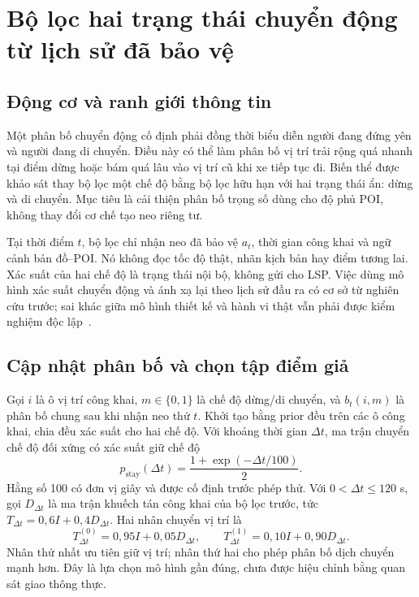 \section{Bộ lọc hai trạng thái chuyển động từ lịch sử đã bảo vệ}
\label{sec:switching-method}

\subsection{Động cơ và ranh giới thông tin}

Một phân bố chuyển động cố định phải đồng thời biểu diễn người đang đứng yên và người đang di chuyển. Điều này có thể làm phân bố vị trí trải rộng quá nhanh tại điểm dừng hoặc bám quá lâu vào vị trí cũ khi xe tiếp tục đi. Biến thể được khảo sát thay bộ lọc một chế độ bằng bộ lọc hữu hạn với hai trạng thái ẩn: dừng và di chuyển. Mục tiêu là cải thiện phân bố trọng số dùng cho độ phủ POI, không thay đổi cơ chế tạo neo riêng tư.

Tại thời điểm $t$, bộ lọc chỉ nhận neo đã bảo vệ $a_t$, thời gian công khai và ngữ cảnh bản đồ--POI. Nó không đọc tốc độ thật, nhãn kịch bản hay điểm tương lai. Xác suất của hai chế độ là trạng thái nội bộ, không gửi cho LSP. Việc dùng mô hình xác suất chuyển động và ánh xạ lại theo lịch sử đầu ra có cơ sở từ nghiên cứu trước; sai khác giữa mô hình thiết kế và hành vi thật vẫn phải được kiểm nghiệm độc lập~\cite{oya2019unknown}.

\subsection{Cập nhật phân bố và chọn tập điểm giả}

Gọi $i$ là ô vị trí công khai, $m\in\{0,1\}$ là chế độ dừng/di chuyển, và $b_t(i,m)$ là phân bố chung sau khi nhận neo thứ $t$. Khởi tạo bằng prior đều trên các ô công khai, chia đều xác suất cho hai chế độ. Với khoảng thời gian $\Delta t$, ma trận chuyển chế độ đối xứng có xác suất giữ chế độ
\begin{equation}
 p_{\mathrm{stay}}(\Delta t)=\frac{1+\exp(-\Delta t/100)}{2}.
\end{equation}
Hằng số 100 có đơn vị giây và được cố định trước phép thử. Với $0<\Delta t\leq120$ s, gọi $D_{\Delta t}$ là ma trận khuếch tán công khai của bộ lọc trước, tức $T_{\Delta t}=0{,}6I+0{,}4D_{\Delta t}$. Hai nhân chuyển vị trí là
\begin{equation}
 T^{(0)}_{\Delta t}=0{,}95I+0{,}05D_{\Delta t},\qquad
 T^{(1)}_{\Delta t}=0{,}10I+0{,}90D_{\Delta t}.
\end{equation}
Nhân thứ nhất ưu tiên giữ vị trí; nhân thứ hai cho phép phân bố dịch chuyển mạnh hơn. Đây là lựa chọn mô hình gần đúng, chưa được hiệu chỉnh bằng quan sát giao thông thực.

